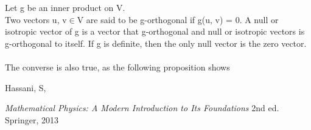 \documentclass[12pt,a4paper]{article}
\begin{document}
Let g be an inner product on V. \\
Two vectors u, v$\in$V are said to be
g-orthogonal if g(u, v) = 0. A null or isotropic vector of g is a vector that
g-orthogonal and null or
isotropic vectors
is g-orthogonal to itself. If g is definite, then the only null vector is the zero
vector. \\\\The converse is also true, as the following proposition shows





\newpage
\begin{thebibliography}{9}

  Hassani, S,

  \emph{Mathematical Physics: A Modern Introduction to Its Foundations}  2nd ed. Springer, 2013



\end{thebibliography}
\end{document}
